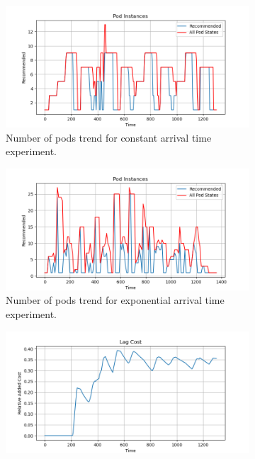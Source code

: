 \begin{figure}[H]
	\begin{subfigure}{0.49\linewidth}
	    \centering
	    \includegraphics[width=1\linewidth]{images/default/constant/pods.png}
	    \caption{Number of pods trend for constant arrival time experiment.}
	    \label{fig:default_constant_pods}
	\end{subfigure}
	\begin{subfigure}{0.49\linewidth}
	    \centering
    		\includegraphics[width=1\linewidth]{images/default/exponential/pods.png}
	    \caption{Number of pods trend for exponential arrival time experiment.}
    		\label{fig:default_exponential_pods}
	\end{subfigure}
	\begin{subfigure}{0.49\linewidth}
	    \centering
	    \includegraphics[width=1\linewidth]{images/default/constant/lag_cost_cumulative.png}

\end{subfigure}
\end{figure}
